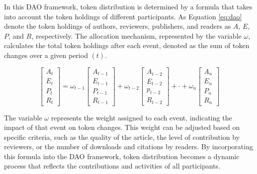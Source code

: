 \documentclass[lettersize,journal]{IEEEtran}
\begin{document}
%



In this DAO framework, token distribution is determined by a formula that takes into account the token holdings of different participants. As Equation \ref{eq:dao} denote the token holdings of authors, reviewers, publishers, and readers as $A$, $E$, $P$, and $R$, respectively. The allocation mechanism, represented by the variable $\omega$, calculates the total token holdings after each event, denoted as the sum of token changes over a given period $(t)$.


\begin{equation}
  \begin{bmatrix}
    A_t \\
    E_t \\
    P_t \\
    R_t
  \end{bmatrix}
  =
  \omega_{t-1}
  \begin{bmatrix}
    A_{t-1} \\
    E_{t-1} \\
    P_{t-1} \\
    R_{t-1}
  \end{bmatrix}
  +
  \omega_{t-2}
  \begin{bmatrix}
    A_{t-2} \\
    E_{t-2} \\
    p_{t-2} \\
    R_{t-2}
  \end{bmatrix}
  +
  \cdot
  +
  \omega_n
  \begin{bmatrix}
    A_n \\
    E_n \\
    P_n \\
    R_n
  \end{bmatrix}
  \label{eq:dao}
\end{equation}



The variable $\omega$ represents the weight assigned to each event, indicating the impact of that event on token changes. This weight can be adjusted based on specific criteria, such as the quality of the article, the level of contribution by reviewers, or the number of downloads and citations by readers.
By incorporating this formula into the DAO framework, token distribution becomes a dynamic process that reflects the contributions and activities of all participants.
\end{document}
